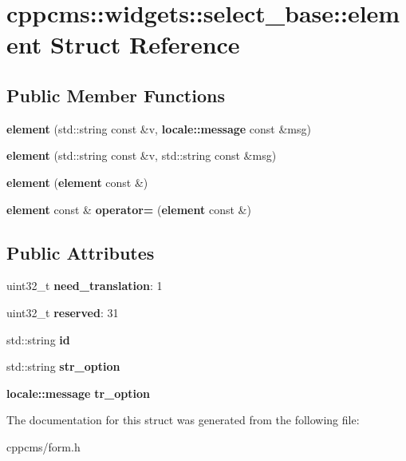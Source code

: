 \section{cppcms\-:\-:widgets\-:\-:select\-\_\-base\-:\-:element \-Struct \-Reference}
\label{structcppcms_1_1widgets_1_1select__base_1_1element}
\subsection*{\-Public \-Member \-Functions}
\begin{DoxyCompactItemize}
\item 
{\bfseries element} (std\-::string const \&v, {\bf locale\-::message} const \&msg)\label{structcppcms_1_1widgets_1_1select__base_1_1element_a2201a008a67419d33ddc6c141543ed6e}

\item 
{\bfseries element} (std\-::string const \&v, std\-::string const \&msg)\label{structcppcms_1_1widgets_1_1select__base_1_1element_a6a575261395968caa7086aaad3c7322c}

\item 
{\bfseries element} ({\bf element} const \&)\label{structcppcms_1_1widgets_1_1select__base_1_1element_a5cbd376bab3bc8c9efe56d4c41bf326f}

\item 
{\bf element} const \& {\bfseries operator=} ({\bf element} const \&)\label{structcppcms_1_1widgets_1_1select__base_1_1element_a5b9a12b09adef1c19ead2de703c26c59}

\end{DoxyCompactItemize}
\subsection*{\-Public \-Attributes}
\begin{DoxyCompactItemize}
\item 
uint32\-\_\-t {\bfseries need\-\_\-translation}\-: 1\label{structcppcms_1_1widgets_1_1select__base_1_1element_ac4a47dc24f69edf6aa32a34cf6040d7e}

\item 
uint32\-\_\-t {\bfseries reserved}\-: 31\label{structcppcms_1_1widgets_1_1select__base_1_1element_a5527142a43733b1963ef6723404c7e4c}

\item 
std\-::string {\bfseries id}\label{structcppcms_1_1widgets_1_1select__base_1_1element_adc7a822a128e5a77ef0dffa3c9bb1157}

\item 
std\-::string {\bfseries str\-\_\-option}\label{structcppcms_1_1widgets_1_1select__base_1_1element_a05a50952d7a19286f8fb671631b6983b}

\item 
{\bf locale\-::message} {\bfseries tr\-\_\-option}\label{structcppcms_1_1widgets_1_1select__base_1_1element_a81d4cfcdae5c17b6020bfbbfacc58e57}

\end{DoxyCompactItemize}


\-The documentation for this struct was generated from the following file\-:\begin{DoxyCompactItemize}
\item 
cppcms/form.\-h\end{DoxyCompactItemize}
